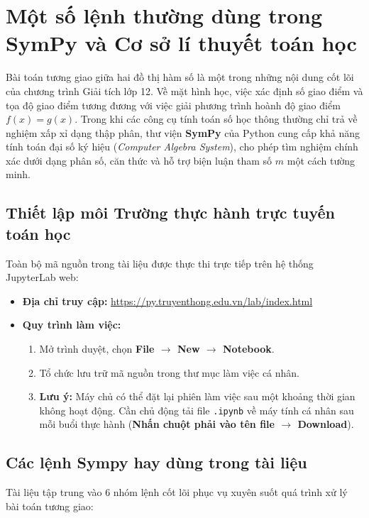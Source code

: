 \chapter{Một số lệnh thường dùng trong SymPy và Cơ sở lí thuyết toán học}

Bài toán tương giao giữa hai đồ thị hàm số là một trong những nội dung cốt lõi của chương trình Giải tích lớp 12. Về mặt hình học, việc xác định số giao điểm và tọa độ giao điểm tương đương với việc giải phương trình hoành độ giao điểm $f(x) = g(x)$. Trong khi các công cụ tính toán số học thông thường chỉ trả về nghiệm xấp xỉ dạng thập phân, thư viện \textbf{SymPy} của Python cung cấp khả năng tính toán đại số ký hiệu (\textit{Computer Algebra System}), cho phép tìm nghiệm chính xác dưới dạng phân số, căn thức và hỗ trợ biện luận tham số $m$ một cách tường minh.

\section{Thiết lập môi Trường thực hành trực tuyến toán học}

Toàn bộ mã nguồn trong tài liệu được thực thi trực tiếp trên hệ thống JupyterLab web:
\begin{itemize}
    \item \textbf{Địa chỉ truy cập:} \url{https://py.truyenthong.edu.vn/lab/index.html}
    \item \textbf{Quy trình làm việc:}
    \begin{enumerate}
        \item Mở trình duyệt, chọn \textbf{File $\rightarrow$ New $\rightarrow$ Notebook}.
        \item Tổ chức lưu trữ mã nguồn trong thư mục làm việc cá nhân.
        \item \textbf{Lưu ý:} Máy chủ có thể đặt lại phiên làm việc sau một khoảng thời gian không hoạt động. Cần chủ động tải file \texttt{.ipynb} về máy tính cá nhân sau mỗi buổi thực hành (\textbf{Nhấn chuột phải vào tên file $\rightarrow$ Download}).
    \end{enumerate}
\end{itemize}

\section{Các lệnh Sympy hay dùng trong tài liệu}

Tài liệu tập trung vào 6 nhóm lệnh cốt lõi phục vụ xuyên suốt quá trình xử lý bài toán tương giao:

